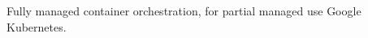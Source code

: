\documentclass[11pt]{scrartcl} %
\begin{document}
Fully managed container orchestration, for partial managed use Google Kubernetes.







\end{document}
